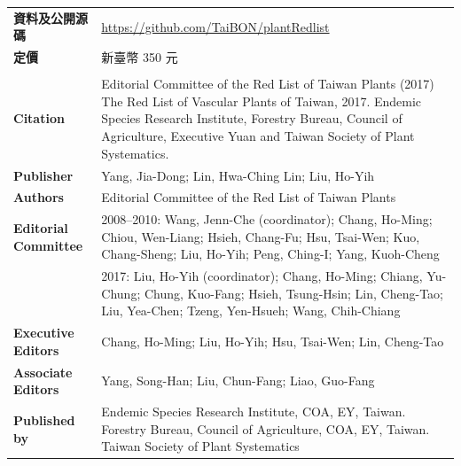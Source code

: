 \begin{table}[H]
{\begin{tabular}{>{\raggedleft\arraybackslash}p{3cm}p{8cm}}
      \textbf{資料及公開源碼}    & \href{https://github.com/TaiBON/plantRedlist}{https://github.com/TaiBON/plantRedlist} \\
      \textbf{定價}              & 新臺幣 350 元 \\
       & \\
      \textbf{Citation}          & Editorial Committee of the Red List of Taiwan Plants (2017) The Red List of Vascular Plants of Taiwan, 2017.
                                   Endemic Species Research Institute, Forestry Bureau, Council of Agriculture, 
                                   Executive Yuan and Taiwan Society of Plant Systematics. \\
      \textbf{Publisher}         & Yang, Jia-Dong; Lin, Hwa-Ching Lin; Liu, Ho-Yih \\
      \textbf{Authors}           & Editorial Committee of the Red List of Taiwan Plants \\
      \textbf{Editorial Committee} & 2008--2010: Wang, Jenn-Che (coordinator);
                                     Chang, Ho-Ming;
                                     Chiou, Wen-Liang;
                                     Hsieh, Chang-Fu;
                                     Hsu, Tsai-Wen;
                                     Kuo, Chang-Sheng;
                                     Liu, Ho-Yih;
                                     Peng, Ching-I;
                                     Yang, Kuoh-Cheng \\
                                   &  2017: Liu, Ho-Yih (coordinator);
                                     Chang, Ho-Ming;
                                     Chiang, Yu-Chung;
                                     Chung, Kuo-Fang;
                                     Hsieh, Tsung-Hsin; 
                                     Lin, Cheng-Tao;
                                     Liu, Yea-Chen;
                                     Tzeng, Yen-Hsueh; 
                                     Wang, Chih-Chiang \\
      \textbf{Executive Editors}  & Chang, Ho-Ming; Liu, Ho-Yih; Hsu, Tsai-Wen; Lin, Cheng-Tao \\
      \textbf{Associate Editors}  & Yang, Song-Han; Liu, Chun-Fang; Liao, Guo-Fang \\
      \textbf{Published by}       & Endemic Species Research Institute, COA, EY, Taiwan.
                                    Forestry Bureau, Council of Agriculture, COA, EY, Taiwan.
                                    Taiwan Society of Plant Systematics \\

\end{tabular}}
\end{table}
